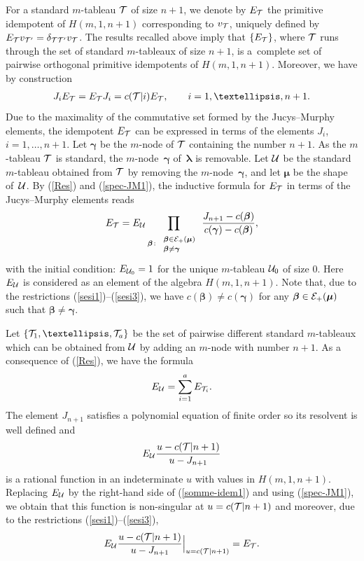 \documentclass[11pt]{article}
\newcommand{\lam}{\boldsymbol{\lambda}}
\newcommand{\mum}{\boldsymbol{\mu}}
\newcommand{\bem}{\boldsymbol{\beta}}
\newcommand{\gam}{\boldsymbol{\gamma}}
\begin{document}
For a standard $m$-tableau ${\cal{T}}$ of size $n+1$, we denote by $E_{{\cal{T}}}$ the primitive idempotent of $H(m,1,n+1)$ corresponding to $v_{{\cal{T}}}$, uniquely def\/ined by
$E_{{\cal{T}}}v_{{\cal{T'}}}=\delta_{{\cal{T}}{\cal{T'}}}v_{{\cal{T}}}$.
The results recalled above imply that $\{E_{{\cal{T}}}\}$, where ${\cal{T}}$ runs through the set of standard $m$-tableaux of size $n+1$, is a~complete set of pairwise orthogonal primitive idempotents of $H(m,1,n+1)$. Moreover, we have
by construction
\begin{gather}\label{spec-JM1}
J_i E_{{\cal{T}}}=E_{{\cal{T}}}J_i=c({\cal{T}}|i) E_{{\cal{T}}} ,\qquad i=1,\dots,n+1  .
\end{gather}
Due to the maximality of the commutative set formed by the Jucys--Murphy elements, the idempotent $E_{{\cal{T}}}$ can be expressed in terms of the elements $J_i$, $i=1,\dots,n+1$.
Let $\gam$ be the $m$-node of ${\cal{T}}$ containing the number $n+1$. As the $m$-tableau ${\cal{T}}$ is standard, the $m$-node~$\gam$ of~$\lam$ is removable. Let ${\cal{U}}$ be the standard $m$-tableau obtained from ${\cal{T}}$ by removing the $m$-node~$\gam$, and let $\mum$ be the shape of~${\cal{U}}$.
By (\ref{Res}) and (\ref{spec-JM1}), the inductive formula for $E_{{\cal{T}}}$ in terms of the Jucys--Murphy elements reads
\begin{gather*}%
E_{{\cal{T}}}=E_{{\cal{U}}}\prod_{\bem\colon \begin{array}{l}\scriptstyle{\bem\in
{\cal{E}}_+(\mum)}\\[-0.5ex] \scriptstyle{\bem\neq \gam}\end{array}} \frac{J_{n+1}-c(\bem)}{c(\gam)-c(\bem)}  ,
\end{gather*}
with the initial condition: $E_{{\cal{U}}_0}=1$ for the unique $m$-tableau ${\cal{U}}_0$ of size $0$. Here $E_{{\cal{U}}}$ is considered
as an element of the algebra $H(m,1,n+1)$. Note that, due to the restrictions (\ref{sesi1})--(\ref{sesi3}), we have $c(\bem)\neq c(\gam)$ for any $\bem\in {\cal{E}}_+(\mum)$ such that $\bem\neq \gam$.


Let $\{ {\cal{T}}_1,\dots,{\cal{T}}_a\}$ be the set of pairwise dif\/ferent standard $m$-tableaux which can be obtained from ${\cal{U}}$ by adding an $m$-node with number $n+1$.
As a consequence of (\ref{Res}), we have the formula
\begin{gather}\label{somme-idem1}
E_{{\cal{U}}}=\sum_{i=1}^a E_{{\cal{T}}_i} .
\end{gather}
The element $J_{n+1}$ satisf\/ies a polynomial equation of f\/inite order so its resolvent is well def\/ined and
\[ E_{{\cal{U}}}  \frac{u-c({\cal{T}}|n+1)}{u-J_{n+1}}\]
is a rational function in an indeterminate $u$ with values in $H(m,1,n+1)$. Replacing $E_{{\cal{U}}}$ by the right-hand side of (\ref{somme-idem1}) and using (\ref{spec-JM1}), we obtain that this function
is non-singular at $u=c({\cal{T}}|n+1)$ and moreover, due to the restrictions (\ref{sesi1})--(\ref{sesi3}),
\begin{gather}\label{idem-JM-inter1} E_{{\cal{U}}}
\frac{u-c({\cal{T}}|n+1)}{u-J_{n+1}} \Bigr\rvert_{u=c({\cal{T}}|n+1)}=E_{{\cal{T}}} .
\end{gather}
\end{document}
